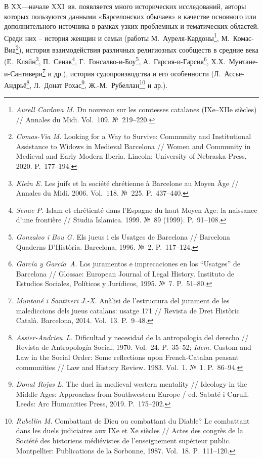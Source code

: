 В XX---начале XXI~вв. появляется много исторических исследований, авторы которых пользуются данными «Барселонских обычаев» в качестве основного или дополнительного источника в рамках узких проблемных и тематических областей. Среди них -- история женщин и семьи (работы М.~Ауреля-Кардоны\footnote{\emph{Aurell Cardona M.} Du nouveau sur les comtesses catalanes (IXe--XIIe siècles) // Annales du Midi. Vol.~109. №~219--220.}, М.~Комас-Виа\footnote{\emph{Comas-Via M.} Looking for a Way to Survive: Community and Institutional Assistance to Widows in Medieval Barcelona // Women and Community in Medieval and Early Modern Iberia. Lincoln: University of Nebraska Press, 2020. P.~177--194.}), история взаимодействия различных религиозных сообществ в средние века (Е.~Кляйн\footnote{\emph{Klein E.} Les juifs et la société chrétienne à Barcelone au Moyen Âge // Annales du Midi. 2006. Vol.~118. №~225. P.~437--440.}, П.~Сенак\footnote{\emph{Senac P.} Islam et chrétienté dans l’Espagne du haut Moyen Age: la naissance d’une frontière // Studia Islamica. 1999. №~89 (1999). P.~91--108.}, Г.~Гонсалво-и-Боу\footnote{\emph{Gonzalvo i Bou G.} Els jueus i els Usatges de Barcelona // Barcelona Quaderns D'Història. Barcelona, 1996. №~2. P.~117--124.}, А.~Гарсия-и-Гарсия\footnote{\emph{García y García~A.} Los juramentos e imprecaciones en los “Usatges” de Barcelona // Glossae: European Journal of Legal History. Instituto de Estudios Sociales, Políticos y Jurídicos, 1995. №~7. P.~51--80.}, Х.Х.~Мунтане-и-Сантивери\footnote{\emph{Muntané i Santiveri J.-X.} Anàlisi de l’estructura del jurament de les malediccions dels jueus catalans: usatge 171 // Revista de Dret Històric Català. Barcelona, 2014. Vol.~13. P.~9--48.} и др.), история судопроизводства и его особенности (Л.~Ассье-Андрьё\footnote{\emph{Assier-Andrieu~L.} Dificultad y necesidad de la antropología del derecho // Revista de Antropología Social, 1970. Vol.~24. P.~35--52; \emph{Idem}. Custom and Law in the Social Order: Some reflections upon French-Catalan peasant communities // Law and History Review. 1983. Vol.~1. №~1. P.~86--94.}, Л.~Донат Рохас\footnote{\emph{Donat Rojas L.} The duel in medieval western mentality // Ideology in the Middle Ages: Approaches from Southwestern Europe / ed. Sabaté i Curull. Leeds: Arc Humanities Press, 2019. P.~175--202.}, Ж.-М.~Рубеллан\footnote{\emph{Rubellin M. }Combattant de Dieu ou combattant du Diable? Le combattant dans les duels judiciaires aux IXe et Xe siècles // Actes des congrès de la Société des historiens médiévistes de l’enseignement supérieur public. Montpellier: Publications de la Sorbonne, 1987. Vol.~18. P.~111--120.} и др.).

